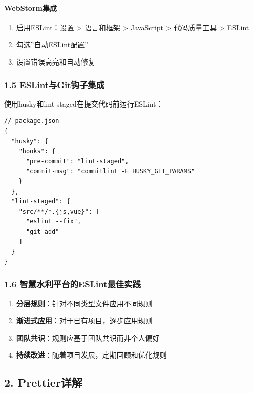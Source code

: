 \paragraph{WebStorm集成}\label{webstormux96c6ux6210}

\begin{enumerate}
\def\labelenumi{\arabic{enumi}.}
\tightlist
\item
  启用ESLint：设置 \textgreater{} 语言和框架 \textgreater{} JavaScript
  \textgreater{} 代码质量工具 \textgreater{} ESLint
\item
  勾选''自动ESLint配置''
\item
  设置错误高亮和自动修复
\end{enumerate}

\subsubsection{1.5
ESLint与Git钩子集成}\label{eslintux4e0egitux94a9ux5b50ux96c6ux6210}

使用husky和lint-staged在提交代码前运行ESLint：

\begin{lstlisting}
// package.json
{
  "husky": {
    "hooks": {
      "pre-commit": "lint-staged",
      "commit-msg": "commitlint -E HUSKY_GIT_PARAMS"
    }
  },
  "lint-staged": {
    "src/**/*.{js,vue}": [
      "eslint --fix",
      "git add"
    ]
  }
}
\end{lstlisting}

\subsubsection{1.6
智慧水利平台的ESLint最佳实践}\label{ux667aux6167ux6c34ux5229ux5e73ux53f0ux7684eslintux6700ux4f73ux5b9eux8df5}

\begin{enumerate}
\def\labelenumi{\arabic{enumi}.}
\tightlist
\item
  \textbf{分层规则}：针对不同类型文件应用不同规则
\item
  \textbf{渐进式应用}：对于已有项目，逐步应用规则
\item
  \textbf{团队共识}：规则应基于团队共识而非个人偏好
\item
  \textbf{持续改进}：随着项目发展，定期回顾和优化规则
\end{enumerate}

\subsection{2. Prettier详解}\label{prettierux8be6ux89e3}

